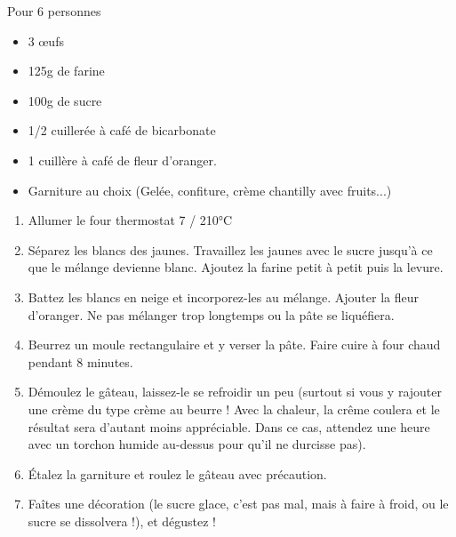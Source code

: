 \bigskip
{}
{Pour 6 personnes}{\begin{itemize}
	\item 3 \oe ufs
	\item 125g de farine
	\item 100g de sucre
	\item 1/2 cuillerée à café de bicarbonate
	\item 1 cuillère à café de fleur d'oranger.
	\item Garniture au choix (Gelée, confiture, crème chantilly avec fruits...)
\end{itemize}}
{\begin{enumerate}
	\item Allumer le four thermostat 7 / 210°C
	\item Séparez les blancs des jaunes. Travaillez les jaunes avec le sucre jusqu'à ce que le mélange devienne blanc. Ajoutez la farine petit à petit puis la levure.
	\item Battez les blancs en neige et incorporez-les au mélange. Ajouter la fleur d'oranger. Ne pas mélanger trop longtemps ou la pâte se liquéfiera.
	\item Beurrez un moule rectangulaire et y verser la pâte. Faire cuire à four chaud pendant 8 minutes.
	\item Démoulez le gâteau, laissez-le se refroidir un peu (surtout si vous y rajouter une crème du type crème au beurre ! Avec la chaleur, la crême coulera et le résultat sera d'autant moins appréciable. Dans ce cas, attendez une heure avec un torchon humide au-dessus pour qu'il ne durcisse pas). 
	\item Étalez la garniture et roulez le gâteau avec précaution. 
	\item Faîtes une décoration (le sucre glace, c'est pas mal, mais à faire à froid, ou le sucre se dissolvera !), et dégustez !
\end{enumerate}}

